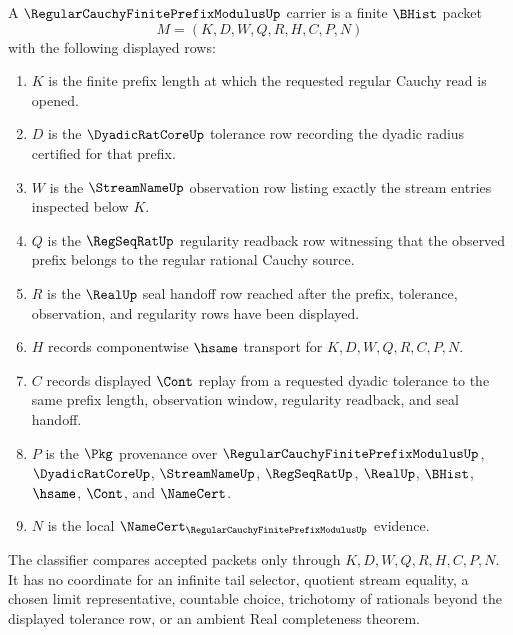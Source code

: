 \begin{definition}
\label{def:regular-cauchy-finite-prefix-modulus-carrier}
A $\RegularCauchyFinitePrefixModulusUp$ carrier is a finite $\BHist$ packet
$$
M=(K,D,W,Q,R,H,C,P,N)
$$
with the following displayed rows:
\begin{enumerate}
\item $K$ is the finite prefix length at which the requested regular Cauchy read is opened.
\item $D$ is the $\DyadicRatCoreUp$ tolerance row recording the dyadic radius certified for that prefix.
\item $W$ is the $\StreamNameUp$ observation row listing exactly the stream entries inspected below $K$.
\item $Q$ is the $\RegSeqRatUp$ regularity readback row witnessing that the observed prefix belongs to the regular rational Cauchy source.
\item $R$ is the $\RealUp$ seal handoff row reached after the prefix, tolerance, observation, and regularity rows have been displayed.
\item $H$ records componentwise $\hsame$ transport for $K,D,W,Q,R,C,P,N$.
\item $C$ records displayed $\Cont$ replay from a requested dyadic tolerance to the same prefix length, observation window, regularity readback, and seal handoff.
\item $P$ is the $\Pkg$ provenance over $\RegularCauchyFinitePrefixModulusUp$, $\DyadicRatCoreUp$, $\StreamNameUp$, $\RegSeqRatUp$, $\RealUp$, $\BHist$, $\hsame$, $\Cont$, and $\NameCert$.
\item $N$ is the local $\NameCert_{\RegularCauchyFinitePrefixModulusUp}$ evidence.
\end{enumerate}
The classifier compares accepted packets only through $K,D,W,Q,R,H,C,P,N$. It has no coordinate for an infinite tail selector, quotient stream equality, a chosen limit representative, countable choice, trichotomy of rationals beyond the displayed tolerance row, or an ambient Real completeness theorem.
\end{definition}

